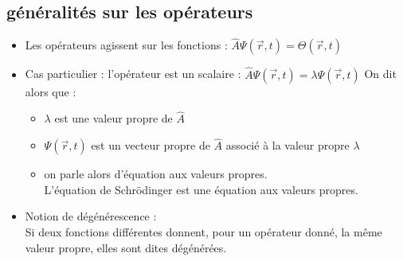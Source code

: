 \documentclass[../main.tex]{subfile}
\begin{document}
\subsection{généralités sur les opérateurs}
\begin{itemize}
	\item Les opérateurs agissent sur les fonctions : $\hat{A}\Psi(\vec{r}, t) = \Theta(\vec{r}, t)$
	\item Cas particulier : l'opérateur est un scalaire : $\hat{A}\Psi(\vec{r}, t) = \lambda \Psi(\vec{r}, t)$
	On dit alors que :\\
	\begin{itemize}
		\item $\lambda$ est une valeur propre de $\hat{A}$
		\item $\Psi(\vec{r}, t)$ est un vecteur propre de $\hat{A}$ associé à la valeur propre $\lambda$
		\item on parle alors d'équation aux valeurs propres.\\
		L'équation de Schrödinger est une équation aux valeurs propres.
	\end{itemize}
	\item Notion de dégénérescence : \\
	Si deux fonctions différentes donnent, pour un opérateur donné, la même valeur propre, elles sont dites dégénérées.
\end{itemize}
\end{document}
